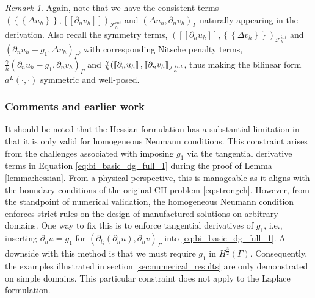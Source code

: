 \documentclass[11pt]{article}
\theoremstyle{remark}
\newtheorem*{remark}{Remark}
\newcommand{\mean}[1]{\left\{\!\!\left\{#1\right\}\!\!\right\}}
\newcommand{\jump}[1]{\left[\!\left[ #1 \right]\!\right]}
\numberwithin{equation}{section}
\begin{document}
                                     \begin{remark}
Again, note that we have the consistent terms $\left( \mean{  \Delta  u_{h} }, \jump{ \partial _{n }v_{h}} \right)_{\mathcal{F}_{h}^{int}} $ and $ \left(   \Delta  u_{h} ,  \partial _{n }v_{h} \right)_{\Gamma }$ naturally appearing in the
derivation. Also recall the symmetry terms, $(  \jump{ \partial _{n} u_{h} }, \mean{ \Delta  v_{h} })_{\mathcal{F}^{int}_{h} } $ and $ (  \partial _{n} u_{h} -  g_{1}, \Delta  v_{h}  )_{\Gamma  } $, with corresponding Nitsche penalty terms, $
\frac{\gamma }{h}(  \partial _{n} u_{h} - g_{1}, \partial _{n} v_{h}  )_{\Gamma  }$ and $ \\ \frac{\gamma }{h}( \jump{ \partial _{n} u_{h} } , \jump{ \partial _{n} v_{h} }
_{\mathcal{F}^{int}_{h} }  $, thus making the bilinear form $a^{L}( \cdot,\cdot ) $ symmetric and well-posed.
                                     \end{remark}

\subsubsection{Comments and earlier work}%
\label{ssub:remarks}

It should be noted that the Hessian formulation has a substantial limitation in that it is only valid for homogeneous Neumann conditions. This constraint arises from the challenges associated with imposing $g_{1}$ via the tangential derivative terms
in Equation \eqref{eq:bi_basic_dg_full_1} during the proof of Lemma \ref{lemma:hessian}.
From a physical perspective, this is manageable as it aligns with the boundary conditions of the original CH problem \eqref{eq:strongch}. However, from the standpoint of numerical validation, the homogeneous Neumann condition enforces strict
rules on the design of manufactured solutions on arbitrary domains. One way to fix this is to enforce tangential derivatives of $g_{1}$, i.e., inserting $\partial _{n}u = g_{1}$ for $ ( \partial _{t_{i}}( \partial_{n}  u ) , \partial _{n} v)_\Gamma  $ into
\eqref{eq:bi_basic_dg_full_1}. A downside with this method is that we must require $g_{1}$ in $ H^{\frac{3}{2}}( \Gamma ) $.
Consequently, the examples illustrated in section \ref{sec:numerical_results} are only demonstrated on simple domains. This particular constraint does not apply to the Laplace formulation.
\end{document}

